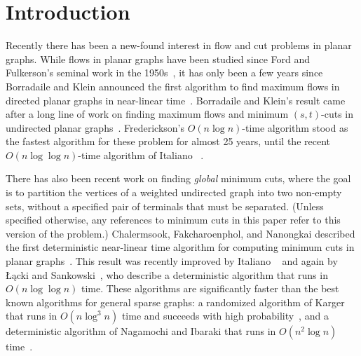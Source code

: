 \documentclass[twoside,leqno,twocolumn]{article}
\begin{document}

\section{Introduction}
\label{S:intro}

Recently there has been a new-found interest in flow and cut problems in planar graphs.  While flows in planar graphs have been studied since Ford and Fulkerson's seminal work in the 1950s~\cite{ff-mfn-56}, it has only been a few years since Borradaile and Klein announced the first algorithm to find maximum flows in  directed planar graphs in near-linear time~\cite{b-epnfc-08, bk-amfdp-09}.  Borradaile and Klein’s result came after a long line of work on finding maximum flows and minimum $(s,t)$-cuts in undirected planar graphs~\cite{f-faspp-87, hj-oamfu-85, is-mfpn-79, r-mstcp-83}.  Frederickson’s $O(n\log n)$-time algorithm \cite{f-faspp-87} stood as the fastest algorithm for these problem for almost 25 years, until the recent $O(n\log\log n)$-time algorithm of Italiano \etal~\cite{insw-iamcmf-11}.

There has also been recent work on finding \emph{global} minimum cuts, where
the goal is to partition the vertices of a weighted undirected graph into two non-empty sets, without a specified pair of terminals that must be separated.  (Unless specified otherwise, any references to minimum cuts in this paper refer to this version of the problem.)  Chalermsook, Fakcharoenphol, and Nanongkai described the first deterministic near-linear time algorithm for computing minimum cuts in planar graphs~\cite{cfn-dnlta-04}.  This result was recently improved by Italiano \etal~\cite{insw-iamcmf-11} and again by Łącki and Sankowski~\cite{ls-mcsc-11}, who describe a deterministic algorithm that runs in $O(n \log \log n)$ time.  These algorithms are significantly faster than the best known algorithms for general sparse graphs: a randomized algorithm of Karger that runs in $O(n\log^3 n)$ time and succeeds with high probability~\cite{k-mcnlt-00}, and a deterministic algorithm
of Nagamochi and Ibaraki that runs in $O(n^2 \log n)$ time~\cite{ni-cemcg-92}.
\end{document}

